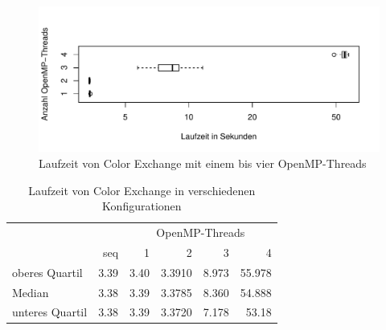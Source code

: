 \documentclass[10pt,a4paper]{article}
\begin{document}
\begin{figure}[H]
\centering
\includegraphics[scale=0.7]{graphs/diag.pdf}
\caption{Laufzeit von Color Exchange mit einem bis vier OpenMP-Threads}
\end{figure}
\begin{table}[H]
\centering
\begin{tabular}{lrrrrr}
\toprule
 & & \multicolumn{4}{c}{OpenMP-Threads} \\
\cmidrule(r){3-6}
 & seq & 1 & 2 & 3 & 4 \\
oberes Quartil 	& 3.39 		& 3.40 		& 3.3910 		& 8.973 		& 55.978 \\
Median 			& 3.38 		& 3.39 		& 3.3785 		& 8.360 		& 54.888 \\
unteres Quartil 	& 3.38 		& 3.39 		& 3.3720 		& 7.178 		& 53.18 \\
\bottomrule
\end{tabular}
\caption{Laufzeit von Color Exchange in verschiedenen Konfigurationen}
\label{tab:CE_runtime}
\end{table}

\end{document}
